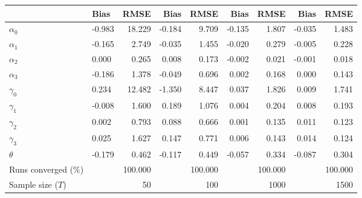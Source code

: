 
\begin{tabular}[t]{llrrrrrrr}
\toprule
  & Bias & RMSE & Bias & RMSE & Bias & RMSE & Bias & RMSE\\
\midrule
$\alpha_{0}$ & -0.983 & 18.229 & -0.184 & 9.709 & -0.135 & 1.807 & -0.035 & 1.483\\
$\alpha_{1}$ & -0.165 & 2.749 & -0.035 & 1.455 & -0.020 & 0.279 & -0.005 & 0.228\\
$\alpha_{2}$ & 0.000 & 0.265 & 0.008 & 0.173 & -0.002 & 0.021 & -0.001 & 0.018\\
$\alpha_{3}$ & -0.186 & 1.378 & -0.049 & 0.696 & 0.002 & 0.168 & 0.000 & 0.143\\
$\gamma_{0}$ & 0.234 & 12.482 & -1.350 & 8.447 & 0.037 & 1.826 & 0.009 & 1.741\\
$\gamma_{1}$ & -0.008 & 1.600 & 0.189 & 1.076 & 0.004 & 0.204 & 0.008 & 0.193\\
$\gamma_{2}$ & 0.002 & 0.793 & 0.088 & 0.666 & 0.001 & 0.135 & 0.011 & 0.123\\
$\gamma_{3}$ & 0.025 & 1.627 & 0.147 & 0.771 & 0.006 & 0.143 & 0.014 & 0.124\\
$\theta$ & -0.179 & 0.462 & -0.117 & 0.449 & -0.057 & 0.334 & -0.087 & 0.304\\
Runs converged (\%) &  & 100.000 &  & 100.000 &  & 100.000 &  & 100.000\\
Sample size ($T$) &  & 50 &  & 100 &  & 1000 &  & 1500\\
\bottomrule
\end{tabular}
